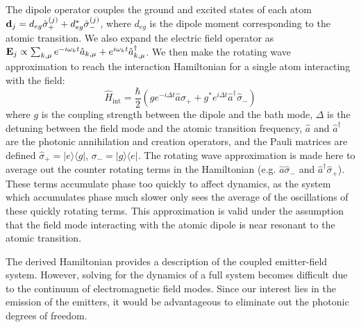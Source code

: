 \documentclass{article}
\begin{document}
The dipole operator couples the ground and excited states of each atom ${\bf d}_j =
d_{eg}\hat{\sigma}_+^{(j)}+d_{eg}^*\hat{\sigma}_-^{(j)}$, where $d_{eg}$ is the dipole moment
corresponding to the atomic transition. We also expand the electric field operator as
${\bf E}_j \propto \sum_{k,\mu}
e^{-i\omega_kt}\hat{a}_{k,\mu}+e^{i\omega_kt}\hat{a}^\dagger_{k,\mu}$.
We then make the rotating wave approximation to reach the interaction Hamiltonian for a single atom interacting with the field:
\begin{equation}
  \hat{H}_{\mathrm{int}} = \frac{\hbar}{2} \left(ge^{-i\Delta t}\hat{a} \hat{\sigma}_+ +
  g^*e^{i\Delta t}\hat{a}^\dagger \hat{\sigma}_-\right)
\end{equation}
where $g$ is the coupling strength between the dipole and the bath mode, $\Delta$ is
the detuning between the field mode and the atomic transition frequency, $\hat{a}$ and
$\hat{a}^\dagger$ are the photonic annihilation and creation operators, and the Pauli
matrices are defined $\hat{\sigma}_+ = |e\rangle\langle g|$,
$\sigma_-=|g\rangle\langle e|$. The rotating wave approximation is made here to
average out the counter rotating terms in the Hamiltonian (e.g.
$\hat{a}\hat{\sigma}_-$ and $\hat{a}^\dagger\hat{\sigma}_+$). These terms accumulate phase
too quickly to affect dynamics, as the system which accumulates phase much slower only
sees the average of the oscillations of these quickly rotating terms. This
approximation is valid under the assumption that the field mode interacting with the
atomic dipole is near resonant to the atomic transition.

The derived Hamiltonian provides a description of the coupled emitter-field system.
However, solving for the dynamics of a full system becomes difficult due to the
continuum of electromagnetic field modes. Since our interest lies in the emission of
the emitters, it would be advantageous to eliminate out the photonic degrees of
freedom.
\end{document}
